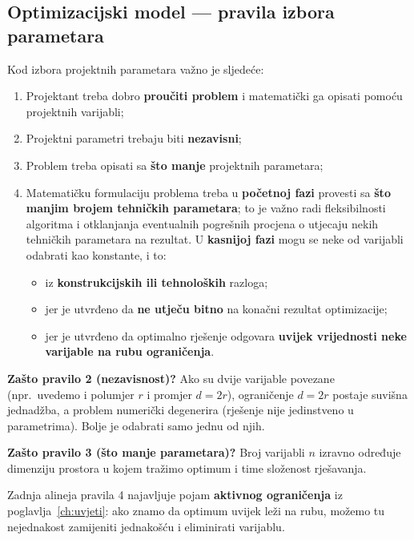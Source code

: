 \subsection{Optimizacijski model --- pravila izbora parametara}

Kod izbora projektnih parametara važno je sljedeće:

\begin{enumerate}
  \item Projektant treba dobro \textbf{proučiti problem} i matematički ga
        opisati pomoću projektnih varijabli;
  \item Projektni parametri trebaju biti \textbf{nezavisni};
  \item Problem treba opisati sa \textbf{što manje} projektnih parametara;
  \item Matematičku formulaciju problema treba u \textbf{početnoj fazi} provesti
        sa \textbf{što manjim brojem tehničkih parametara}; to je važno radi
        fleksibilnosti algoritma i otklanjanja eventualnih pogrešnih procjena o
        utjecaju nekih tehničkih parametara na rezultat. U \textbf{kasnijoj
        fazi} mogu se neke od varijabli odabrati kao konstante, i to:
        \begin{itemize}
          \item iz \textbf{konstrukcijskih ili tehnoloških} razloga;
          \item jer je utvrđeno da \textbf{ne utječu bitno} na konačni rezultat
                optimizacije;
          \item jer je utvrđeno da optimalno rješenje odgovara \textbf{uvijek
                vrijednosti neke varijable na rubu ograničenja}.
        \end{itemize}
\end{enumerate}

\begin{napomena}
\textbf{Zašto pravilo 2 (nezavisnost)?} Ako su dvije varijable povezane (npr.\
uvedemo i polumjer $r$ i promjer $d = 2r$), ograničenje $d = 2r$ postaje suvišna
jednadžba, a problem numerički degenerira (rješenje nije jedinstveno u
parametrima). Bolje je odabrati samo jednu od njih.

\textbf{Zašto pravilo 3 (što manje parametara)?} Broj varijabli $n$ izravno
određuje dimenziju prostora u kojem tražimo optimum i time složenost
rješavanja.

Zadnja alineja pravila 4 najavljuje pojam \textbf{aktivnog ograničenja} iz
poglavlja~\ref{ch:uvjeti}: ako znamo da optimum uvijek leži na rubu, možemo tu
nejednakost zamijeniti jednakošću i eliminirati varijablu.
\end{napomena}

